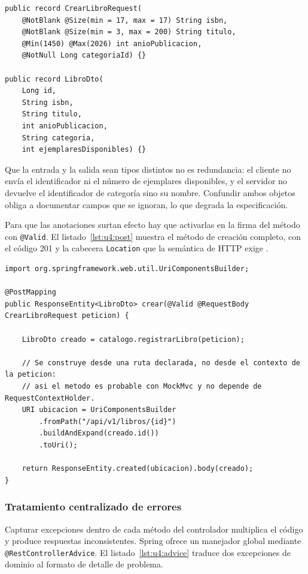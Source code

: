 \documentclass[11pt,a4paper,openany]{book}
\begin{document}
\begin{lstlisting}[style=java,caption={Objetos de transferencia diferenciados para entrada y salida.},label={lst:u4:dto}]
public record CrearLibroRequest(
	@NotBlank @Size(min = 17, max = 17) String isbn,
	@NotBlank @Size(min = 3, max = 200) String titulo,
	@Min(1450) @Max(2026) int anioPublicacion,
	@NotNull Long categoriaId) {}

public record LibroDto(
	Long id,
	String isbn,
	String titulo,
	int anioPublicacion,
	String categoria,
	int ejemplaresDisponibles) {}
\end{lstlisting}

Que la entrada y la salida sean tipos distintos no es redundancia: el cliente no envía el identificador ni el número de ejemplares disponibles, y el servidor no devuelve el identificador de categoría sino su nombre. Confundir ambos objetos obliga a documentar campos que se ignoran, lo que degrada la especificación.

Para que las anotaciones surtan efecto hay que activarlas en la firma del método con \texttt{@Valid}. El listado~\ref{lst:u4:post} muestra el método de creación completo, con el código 201 y la cabecera \texttt{Location} que la semántica de HTTP exige \cite{rfc9110}.

\begin{lstlisting}[style=java,caption={Creacion de un recurso con codigo 201 y cabecera Location.},label={lst:u4:post}]
import org.springframework.web.util.UriComponentsBuilder;

@PostMapping
public ResponseEntity<LibroDto> crear(@Valid @RequestBody CrearLibroRequest peticion) {

	LibroDto creado = catalogo.registrarLibro(peticion);

	// Se construye desde una ruta declarada, no desde el contexto de la peticion:
	// asi el metodo es probable con MockMvc y no depende de RequestContextHolder.
	URI ubicacion = UriComponentsBuilder
		.fromPath("/api/v1/libros/{id}")
		.buildAndExpand(creado.id())
		.toUri();

	return ResponseEntity.created(ubicacion).body(creado);
}
\end{lstlisting}

\subsubsection{Tratamiento centralizado de errores}

Capturar excepciones dentro de cada método del controlador multiplica el código y produce respuestas inconsistentes. Spring ofrece un manejador global mediante \texttt{@RestControllerAdvice}. El listado~\ref{lst:u4:advice} traduce dos excepciones de dominio al formato de detalle de problema.
\end{document}
